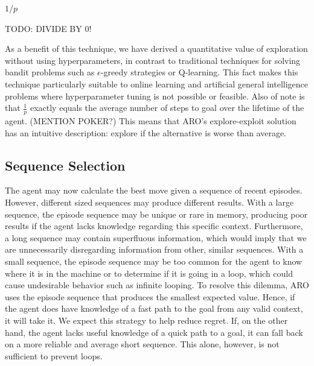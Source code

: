 \documentclass[letterpaper]{article} %
\begin{document}
\begin{algorithmic}[-1]
	
		\State \Return $1/p$
	\EndFunction
	
\end{algorithmic}

TODO: DIVIDE BY 0!

As a benefit of this technique, we have derived a quantitative value of exploration without using hyperparameters, in contrast to traditional techniques for solving bandit problems such as $\epsilon$-greedy strategies or Q-learning. This fact makes this technique particularly suitable to online learning and artificial general intelligence problems where hyperparameter tuning is not possible or feasible. Also of note is that $\frac{1}{p}$ exactly equals the average number of steps to goal over the lifetime of the agent. (MENTION POKER?) This means that ARO's explore-exploit solution has an intuitive description: explore if the alternative is worse than average.

\subsection{Sequence Selection}

The agent may now calculate the best move given a sequence of recent episodes. However, different sized sequences may produce different results. With a large sequence, the episode sequence may be unique or rare in memory, producing poor results if the agent lacks knowledge regarding this specific context. Furthermore, a long sequence may contain superfluous information, which would imply that we are unnecessarily disregarding information from other, similar sequences. With a small sequence, the episode sequence may be too common for the agent to know where it is in the machine or to determine if it is going in a loop, which could cause undesirable behavior such as infinite looping. To resolve this dilemma, ARO uses the episode sequence that produces the smallest expected value. Hence, if the agent does have knowledge of a fast path to the goal from any valid context, it will take it. We expect this strategy to help reduce regret. If, on the other hand, the agent lacks useful knowledge of a quick path to a goal, it can fall back on a more reliable and average short sequence. This alone, however, is not sufficient to prevent loops.
\end{document}
